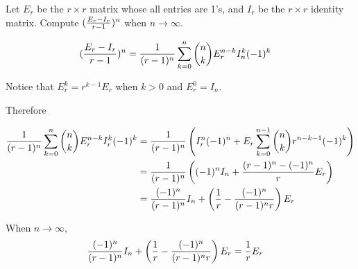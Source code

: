 \documentclass{article}
\begin{document}
Let $E_r$ be the $r \times r$ matrix whose all entries are 1's, 
and $I_r$ be the $r \times r$ identity matrix. 
Compute $({E_r - I_r \over r - 1})^n$ when $n \to \infty$.

\begin{align*}
({E_r - I_r \over r - 1})^n 
&= {1 \over (r - 1)^n} \sum_{k=0}^n {n \choose k} E_r^{n - k} I_n^k (-1)^k
\end{align*}

Notice that $E_r^k = r^{k - 1} E_r$ when $k > 0$
and $E_r^0 = I_n$.

Therefore

\begin{align*}
{1 \over (r - 1)^n} \sum_{k=0}^n {n \choose k} E_r^{n - k} I_r^k (-1)^k
&= {1 \over (r - 1)^n} 
	\left(I_r^n(-1)^n 
		+ E_r \sum_{k=0}^{n - 1} {n \choose k} r^{n - k - 1} (-1)^k
	\right) \\
&= {1 \over (r - 1)^n}
	\left((-1)^n I_n + {(r - 1)^n - (-1)^n \over r}E_r
	\right) \\
&= {(-1)^n \over (r - 1)^n} I_n + 
	\left({1 \over r} - {(-1)^n \over (r - 1)^n r}
	\right) E_r
\end{align*}

When $n \to \infty$, 
\begin{align*}
{(-1)^n \over (r - 1)^n} I_n + 
	\left({1 \over r} - {(-1)^n \over (r - 1)^n r}
	\right) E_r
&= {1 \over r} E_r
\end{align*}
\end{document}

